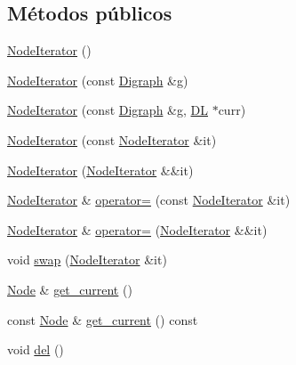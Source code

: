 \subsection*{Métodos públicos}
\begin{DoxyCompactItemize}
\item 
\hyperlink{class_designar_1_1_digraph_1_1_node_iterator_a53d6530188cf6c4ed6d2b2b114af9967}{Node\+Iterator} ()
\item 
\hyperlink{class_designar_1_1_digraph_1_1_node_iterator_aa54e560d151fad3a8e36c91dc4006ce4}{Node\+Iterator} (const \hyperlink{class_designar_1_1_digraph}{Digraph} \&g)
\item 
\hyperlink{class_designar_1_1_digraph_1_1_node_iterator_a2a8d16402a7ec8ac1675cb2729bc4726}{Node\+Iterator} (const \hyperlink{class_designar_1_1_digraph}{Digraph} \&g, \hyperlink{class_designar_1_1_d_l}{DL} $\ast$curr)
\item 
\hyperlink{class_designar_1_1_digraph_1_1_node_iterator_a44f61f9d3101b8d44d864448d5b7c73a}{Node\+Iterator} (const \hyperlink{class_designar_1_1_digraph_1_1_node_iterator}{Node\+Iterator} \&it)
\item 
\hyperlink{class_designar_1_1_digraph_1_1_node_iterator_a36ab758f25d1e498d743dee93cb9a013}{Node\+Iterator} (\hyperlink{class_designar_1_1_digraph_1_1_node_iterator}{Node\+Iterator} \&\&it)
\item 
\hyperlink{class_designar_1_1_digraph_1_1_node_iterator}{Node\+Iterator} \& \hyperlink{class_designar_1_1_digraph_1_1_node_iterator_a5a3b469e7e11a1edc675b50c32675282}{operator=} (const \hyperlink{class_designar_1_1_digraph_1_1_node_iterator}{Node\+Iterator} \&it)
\item 
\hyperlink{class_designar_1_1_digraph_1_1_node_iterator}{Node\+Iterator} \& \hyperlink{class_designar_1_1_digraph_1_1_node_iterator_a5e7f1b52084070e0129b0ac21e01ece9}{operator=} (\hyperlink{class_designar_1_1_digraph_1_1_node_iterator}{Node\+Iterator} \&\&it)
\item 
void \hyperlink{class_designar_1_1_digraph_1_1_node_iterator_a12cabc8c33105f26a202acf90b0f49ab}{swap} (\hyperlink{class_designar_1_1_digraph_1_1_node_iterator}{Node\+Iterator} \&it)
\item 
\hyperlink{class_designar_1_1_digraph_a4dc921c41a480b7946a04170e997d8ae}{Node} \& \hyperlink{class_designar_1_1_digraph_1_1_node_iterator_a2d9961869a4ec52a112354600094646c}{get\+\_\+current} ()
\item 
const \hyperlink{class_designar_1_1_digraph_a4dc921c41a480b7946a04170e997d8ae}{Node} \& \hyperlink{class_designar_1_1_digraph_1_1_node_iterator_a99f4eef333d432b662710b2868761d35}{get\+\_\+current} () const
\item 
void \hyperlink{class_designar_1_1_digraph_1_1_node_iterator_a8d68d82384631f601055ef9b742b0dbf}{del} ()
\end{DoxyCompactItemize}
